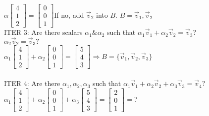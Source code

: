 \documentclass [12pt]{article}
\begin{document}
$\alpha\begin{bmatrix}
4\\
1\\
2
\end{bmatrix}=\begin{bmatrix}
0\\
0\\
1
\end{bmatrix}$\indent If no, add $\overrightarrow{v}_2$ into $B$. $B={\overrightarrow{v}_1,\overrightarrow{v}_2}$\\
ITER 3: Are there scalars $\alpha_1\&\alpha_2$ such that $\alpha_1\overrightarrow{v}_1+\alpha_2\overrightarrow{v}_2=\overrightarrow{v}_3$?\\
$\alpha_2\overrightarrow{v}_2=\overrightarrow{v}_3?$\\
$\alpha_1\begin{bmatrix}
4\\
1\\
2
\end{bmatrix}+\alpha_2\begin{bmatrix}
0\\
0\\
1
\end{bmatrix}=\begin{bmatrix}
5\\
4\\
3
\end{bmatrix}\Rightarrow B=\{\overrightarrow{v}_1,\overrightarrow{v}_2,\overrightarrow{v}_3\}$\\\\
ITER 4: Are there $\alpha_1,\alpha_2,\alpha_3$ such that $\alpha_1\overrightarrow{v}_1+\alpha_2\overrightarrow{v}_2+\alpha_3\overrightarrow{v}_3=\overrightarrow{v}_4?$\\
$\alpha_1\begin{bmatrix}
4\\
1\\
2
\end{bmatrix}+\alpha_2\begin{bmatrix}
0\\
0\\
1
\end{bmatrix}+\alpha_3\begin{bmatrix}
5\\
4\\
3
\end{bmatrix}=\begin{bmatrix}
2\\
0\\
1
\end{bmatrix} = ?$\\\\
\end{document}
